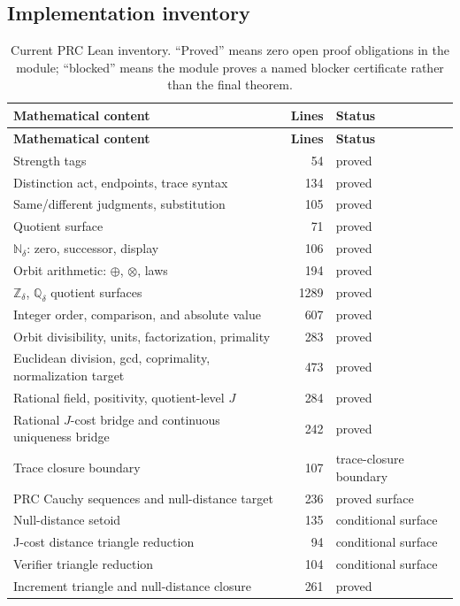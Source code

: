 \documentclass[11pt,a4paper]{article}
\theoremstyle{definition}
\theoremstyle{remark}
\begin{document}
\subsection{Implementation inventory}

\small
\begin{longtable}{p{7.0cm}rp{4.4cm}}
\caption{Current PRC Lean inventory. ``Proved'' means zero open proof
obligations in the module; ``blocked'' means the module proves a named blocker
certificate rather than the final theorem.}
\label{tab:inventory}\\
\toprule
\textbf{Mathematical content} & \textbf{Lines} & \textbf{Status} \\
\midrule
\endfirsthead
\toprule
\textbf{Mathematical content} & \textbf{Lines} & \textbf{Status} \\
\midrule
\endhead
Strength tags & 54 & proved \\
Distinction act, endpoints, trace syntax & 134 & proved \\
Same/different judgments, substitution & 105 & proved \\
Quotient surface & 71 & proved \\
$\mathbb{N}_\delta$: zero, successor, display & 106 & proved \\
Orbit arithmetic: $\oplus$, $\otimes$, laws & 194 & proved \\
$\mathbb{Z}_\delta$, $\mathbb{Q}_\delta$ quotient surfaces & 1289 & proved \\
Integer order, comparison, and absolute value & 607 & proved \\
Orbit divisibility, units, factorization, primality & 283 & proved \\
Euclidean division, gcd, coprimality, normalization target & 473 & proved \\
Rational field, positivity, quotient-level $J$ & 284 & proved \\
Rational $J$-cost bridge and continuous uniqueness bridge & 242 & proved \\
Trace closure boundary & 107 & trace-closure boundary \\
PRC Cauchy sequences and null-distance target & 236 & proved surface \\
Null-distance setoid & 135 & conditional surface \\
J-cost distance triangle reduction & 94 & conditional surface \\
Verifier triangle reduction & 104 & conditional surface \\
Increment triangle and null-distance closure & 261 & proved \\

\end{longtable}
\end{document}
